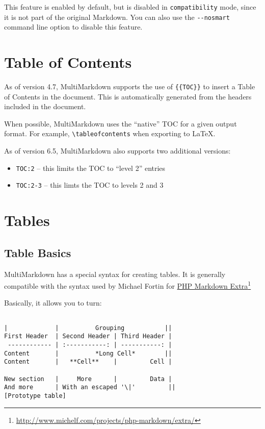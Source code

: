 This feature is enabled by default, but is disabled in \texttt{compatibility} mode, since it is not part of the original Markdown. You can also use the \texttt{-{}-nosmart} command line option to disable this feature.

\section{Table of Contents}
\label{tableofcontents}

As of version 4.7, MultiMarkdown supports the use of \texttt{\{\{TOC\}\}} to insert a Table of Contents in the document. This is automatically generated from the headers included in the document.

When possible, MultiMarkdown uses the ``native'' TOC for a given output format. For example, \texttt{\textbackslash{}tableofcontents} when exporting to LaTeX.

As of version 6.5, MultiMarkdown also supports two additional versions:

\begin{itemize}
\item \texttt{{{TOC:2}}} -- this limits the TOC to ``level 2'' entries

\item \texttt{{{TOC:2-3}}} -- this limts the TOC to levels 2 and 3

\end{itemize}

\section{Tables}
\label{tables}

\subsection{Table Basics}
\label{tablebasics}

MultiMarkdown has a special syntax for creating tables. It is generally compatible with the syntax used by Michael Fortin for \href{http://www.michelf.com/projects/php-markdown/extra/}{PHP Markdown Extra}\footnote{\href{http://www.michelf.com/projects/php-markdown/extra/}{http:\slash{}\slash{}www.michelf.com\slash{}projects\slash{}php-markdown\slash{}extra\slash{}}}

Basically, it allows you to turn:

\begin{verbatim}

|             |          Grouping           ||
First Header  | Second Header | Third Header |
 ------------ | :-----------: | -----------: |
Content       |          *Long Cell*        ||
Content       |   **Cell**    |         Cell |

New section   |     More      |         Data |
And more      | With an escaped '\|'         ||  
[Prototype table]

\end{verbatim}

